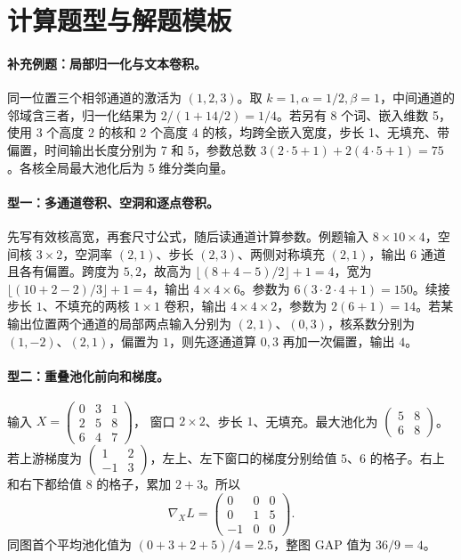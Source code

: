 \documentclass[UTF8,a4paper,zihao=-4,fontset=fandol]{ctexrep}
\begin{document}
\section{计算题型与解题模板}

\paragraph{补充例题：局部归一化与文本卷积。}
同一位置三个相邻通道的激活为 $(1,2,3)$。取 $k=1,\alpha=1/2,\beta=1$，中间通道的邻域含三者，归一化结果为 $2/(1+14/2)=1/4$。若另有 8 个词、嵌入维数 5，使用 3 个高度 2 的核和 2 个高度 4 的核，均跨全嵌入宽度，步长 1、无填充、带偏置，时间输出长度分别为 7 和 5，参数总数 $3(2\cdot5+1)+2(4\cdot5+1)=75$。各核全局最大池化后为 5 维分类向量。

\paragraph{型一：多通道卷积、空洞和逐点卷积。}
先写有效核高宽，再套尺寸公式，随后读通道计算参数。例题输入 $8\times10\times4$，空间核 $3\times2$，空洞率 $(2,1)$、步长 $(2,3)$、两侧对称填充 $(2,1)$，输出 $6$ 通道且各有偏置。跨度为 $5,2$，故高为 $\lfloor(8+4-5)/2\rfloor+1=4$，宽为 $\lfloor(10+2-2)/3\rfloor+1=4$，输出 $4\times4\times6$。参数为 $6(3\cdot2\cdot4+1)=150$。续接步长 $1$、不填充的两核 $1\times1$ 卷积，输出 $4\times4\times2$，参数为 $2(6+1)=14$。若某输出位置两个通道的局部两点输入分别为 $(2,1)$、$(0,3)$，核系数分别为 $(1,-2)$、$(2,1)$，偏置为 $1$，则先逐通道算 $0,3$ 再加一次偏置，输出 $4$。

\paragraph{型二：重叠池化前向和梯度。}
输入
$X=\begin{pmatrix}0&3&1\\2&5&8\\6&4&7\end{pmatrix}$，
窗口 $2\times2$、步长 $1$、无填充。最大池化为
$\begin{pmatrix}5&8\\6&8\end{pmatrix}$。
若上游梯度为 $\begin{pmatrix}1&2\\-1&3\end{pmatrix}$，左上、左下窗口的梯度分别给值 $5$、$6$ 的格子。右上和右下都给值 $8$ 的格子，累加 $2+3$。所以
\[
 \nabla_X L=\begin{pmatrix}0&0&0\\0&1&5\\-1&0&0\end{pmatrix}.
\]
同图首个平均池化值为 $(0+3+2+5)/4=2.5$，整图 GAP 值为 $36/9=4$。
\end{document}
